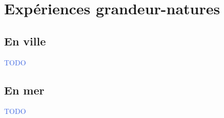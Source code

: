 \documentclass[../main.tex]{subfiles}
\begin{document}
\section{Expériences grandeur-natures}

\subsection{En ville}

\begin{frame}{\subsecname}
  \begin{center}
    \textcolor{RoyalBlue}{TODO}
  \end{center}
\end{frame}

\subsection{En mer}

\begin{frame}{\subsecname}
  \begin{center}
    \textcolor{RoyalBlue}{TODO}
  \end{center}
\end{frame}
\end{document}

